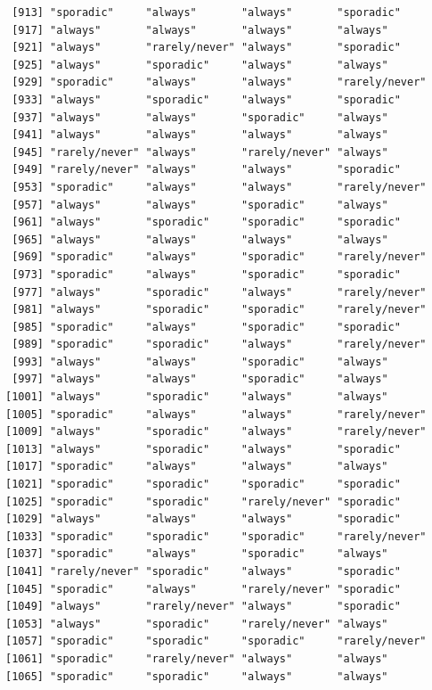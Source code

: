 \documentclass[
  letterpaper,
  DIV=11,
  numbers=noendperiod]{scrartcl}
\begin{document}
\begin{verbatim}
 [913] "sporadic"     "always"       "always"       "sporadic"    
 [917] "always"       "always"       "always"       "always"      
 [921] "always"       "rarely/never" "always"       "sporadic"    
 [925] "always"       "sporadic"     "always"       "always"      
 [929] "sporadic"     "always"       "always"       "rarely/never"
 [933] "always"       "sporadic"     "always"       "sporadic"    
 [937] "always"       "always"       "sporadic"     "always"      
 [941] "always"       "always"       "always"       "always"      
 [945] "rarely/never" "always"       "rarely/never" "always"      
 [949] "rarely/never" "always"       "always"       "sporadic"    
 [953] "sporadic"     "always"       "always"       "rarely/never"
 [957] "always"       "always"       "sporadic"     "always"      
 [961] "always"       "sporadic"     "sporadic"     "sporadic"    
 [965] "always"       "always"       "always"       "always"      
 [969] "sporadic"     "always"       "sporadic"     "rarely/never"
 [973] "sporadic"     "always"       "sporadic"     "sporadic"    
 [977] "always"       "sporadic"     "always"       "rarely/never"
 [981] "always"       "sporadic"     "sporadic"     "rarely/never"
 [985] "sporadic"     "always"       "sporadic"     "sporadic"    
 [989] "sporadic"     "sporadic"     "always"       "rarely/never"
 [993] "always"       "always"       "sporadic"     "always"      
 [997] "always"       "always"       "sporadic"     "always"      
[1001] "always"       "sporadic"     "always"       "always"      
[1005] "sporadic"     "always"       "always"       "rarely/never"
[1009] "always"       "sporadic"     "always"       "rarely/never"
[1013] "always"       "sporadic"     "always"       "sporadic"    
[1017] "sporadic"     "always"       "always"       "always"      
[1021] "sporadic"     "sporadic"     "sporadic"     "sporadic"    
[1025] "sporadic"     "sporadic"     "rarely/never" "sporadic"    
[1029] "always"       "always"       "always"       "sporadic"    
[1033] "sporadic"     "sporadic"     "sporadic"     "rarely/never"
[1037] "sporadic"     "always"       "sporadic"     "always"      
[1041] "rarely/never" "sporadic"     "always"       "sporadic"    
[1045] "sporadic"     "always"       "rarely/never" "sporadic"    
[1049] "always"       "rarely/never" "always"       "sporadic"    
[1053] "always"       "sporadic"     "rarely/never" "always"      
[1057] "sporadic"     "sporadic"     "sporadic"     "rarely/never"
[1061] "sporadic"     "rarely/never" "always"       "always"      
[1065] "sporadic"     "sporadic"     "always"       "always"      

\end{verbatim}
\end{document}
